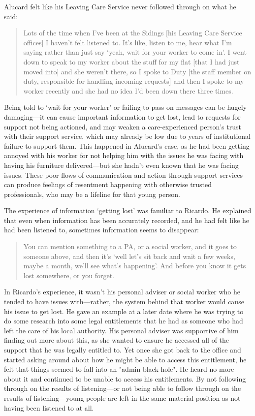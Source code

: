 Alucard felt like his Leaving Care Service never followed through on what he said:
\begin{quote}
Lots of the time when I've been at the Sidings [his Leaving Care Service offices] I haven't felt listened to. It's like, listen to me, hear what I'm saying rather than just say `yeah, wait for your worker to come in'. I went down to speak to my worker about the stuff for my flat [that I had just moved into] and she weren't there, so I spoke to Duty [the staff member on duty, responsible for handling incoming requests] and then I spoke to my worker recently and she had no idea I'd been down there three times.
\end{quote}
Being told to `wait for your worker' or failing to pass on messages can be hugely damaging—it can cause important information to get lost, lead to requests for support not being actioned, and may weaken a care-experienced person’s trust with their support service, which may already be low due to years of institutional failure to support them.  This happened in Alucard’s case, as he had been getting annoyed with his worker for not helping him with the issues he was facing with having his furniture delivered—but she hadn’t even known that he was facing issues. These poor flows of communication and action through support services can produce feelings of resentment happening with otherwise trusted professionals, who may be a lifeline for that young person. 

The experience of information `getting lost' was familiar to Ricardo. He explained that even when information has been accurately recorded, and he had felt like he had been listened to, sometimes information seems to disappear:
\begin{quote}
You can mention something to a PA, or a social worker, and it goes to someone above, and then it's `well let's sit back and wait a few weeks, maybe a month, we'll see what's happening'. And before you know it gets lost somewhere, or you forget.
\end{quote}
In Ricardo's experience, it wasn’t his personal adviser or social worker who he tended to have issues with—rather, the system behind that worker would cause his issue to get lost. He gave an example at a later date where he was trying to do some research into some legal entitlements that he had as someone who had left the care of his local authority. His personal adviser was supportive of him finding out more about this, as she wanted to ensure he accessed all of the support that he was legally entitled to. Yet once she got back to the office and started asking around about how he might be able to access this entitlement, he felt that things seemed to fall into an "admin black hole". He heard no more about it and continued to be unable to access his entitlements. By not following through on the results of listening—or not being able to follow through on the results of listening—young people are left in the same material position as not having been listened to at all. 

